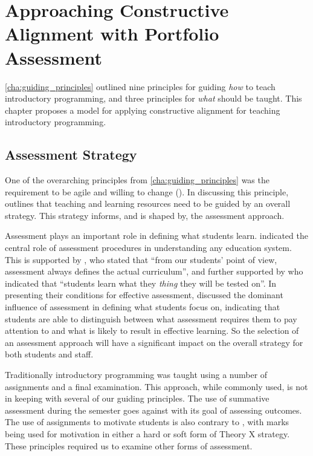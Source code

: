 
\chapter{Approaching Constructive Alignment with Portfolio Assessment} %
\label{cha:approach}

\graphicspath{{Figures/CAApproach/}}

\cref{cha:guiding_principles} outlined nine principles for guiding \emph{how} to teach introductory programming, and three principles for \emph{what} should be taught. This chapter proposes a model for applying constructive alignment for teaching introductory programming.

\section{Assessment Strategy} %
\label{sec:assessment_strategy}

One of the overarching principles from \cref{cha:guiding_principles} was the requirement to be agile and willing to change (). In discussing this principle,  outlines that teaching and learning resources need to be guided by an overall strategy. This strategy informs, and is shaped by, the assessment approach. 

Assessment plays an important role in defining what students learn. \citet{Rowntree:1977} indicated the central role of assessment procedures in understanding any education system. This is supported by \citet{Ramsden:2003}, who stated that ``from our students' point of view, assessment always defines the actual curriculum'', and further supported by \citet{Biggs:2007} who indicated that ``students learn what they \emph{thing} they will be tested on''. In presenting their conditions for effective assessment, \citet{Gibbs:2004} discussed the dominant influence of assessment in defining what students focus on, indicating that students are able to distinguish between what assessment requires them to pay attention to and what is likely to result in effective learning. So the selection of an assessment approach will have a significant impact on the overall strategy for both students and staff. 

Traditionally introductory programming was taught using a number of assignments and a final examination. This approach, while commonly used, is not in keeping with several of our guiding principles. The use of summative assessment during the semester goes against  with its goal of assessing outcomes. The use of assignments to motivate students is also contrary to , with marks being used for motivation in either a hard or soft form of Theory X strategy. These principles required us to examine other forms of assessment.


